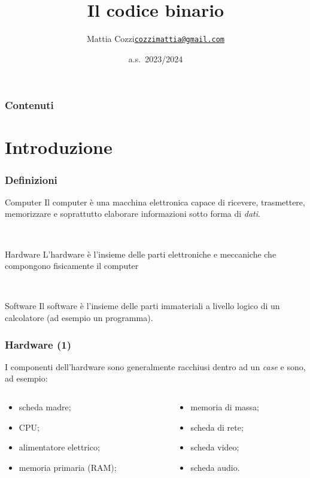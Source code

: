 \documentclass[handout]{beamer}
\title{Il codice binario}
\author{\texorpdfstring{Mattia Cozzi\newline\href{mailto:cozzimattia@gmail.com}{\texttt{cozzimattia@gmail.com}}}{Mattia Cozzi}}
\date{a.s.~2023/2024}
\begin{document}
\begin{frame}
  \titlepage
\end{frame}


\begin{frame}
\frametitle{Contenuti}
\tableofcontents
\end{frame}

\section{Introduzione}

\begin{frame}
\frametitle{Definizioni}
\begin{block}{Computer}
  Il computer è una macchina elettronica capace di ricevere, trasmettere, memorizzare e soprattutto elaborare informazioni sotto forma di \emph{dati}.
\end{block}\pause

~

\begin{block}{Hardware}
  L'hardware è l'insieme delle parti elettroniche e meccaniche che compongono fisicamente il computer
\end{block}\pause

~

\begin{block}{Software}
  Il software è l'insieme delle parti immateriali a livello logico di un calcolatore (ad esempio un programma).
\end{block}
\end{frame}



\begin{frame}
\frametitle{Hardware (1)}
I componenti dell'hardware sono generalmente racchiusi dentro ad un \emph{case}{\pause} e sono, ad esempio:
\begin{columns}
  \begin{column}{0.4\textwidth}
    \begin{itemize}
      \item scheda madre;\pause
      \item CPU;\pause
      \item alimentatore elettrico;\pause
      \item memoria primaria (RAM);\pause
    \end{itemize}
    \end{column}
  \begin{column}{0.4\textwidth}
    \begin{itemize}
      \item memoria di massa;\pause
      \item scheda di rete;\pause
      \item scheda video;\pause
      \item scheda audio.
    \end{itemize}
    \end{column}
\end{columns}
\end{frame}
\end{document}
